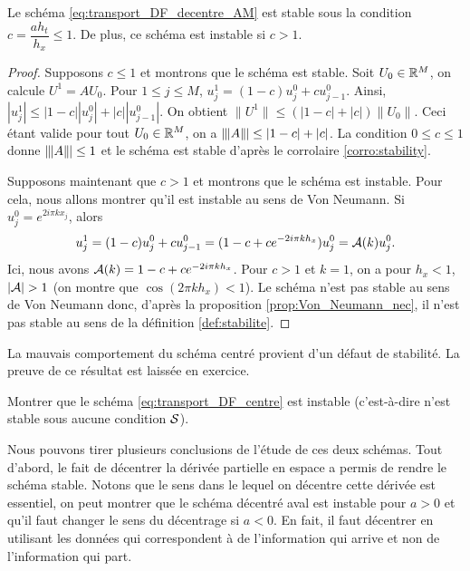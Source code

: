 \documentclass[12pt,a4paper,twoside]{article}
\begin{document}
\begin{proposition}
  \label{prop:stabilite_transport_AM}
  Le sch\'ema \eqref{eq:transport_DF_decentre_AM} est stable
  sous la condition $c = \dfrac{a h_t}{h_x} \leq 1$.
  De plus, ce sch\'ema est instable si $c > 1$.
\end{proposition}
\begin{proof}
  Supposons $c \leq 1$ et montrons que le sch\'ema est stable.
  Soit $U_0 \in \mathbb{R}^M$, on calcule $U^1 = A U_0$.
  Pour $1 \leq j \leq M$, 
  $u_j^1 = (1-c) u_j^0 + c u_{j-1}^0$.
  Ainsi, $|u_j^1| \leq |1-c| | u_j^0 | + | c | | u_{j-1}^0 |$.
  On obtient $\| U^1 \| \leq (|1-c| + |c|) \| U_0 \|$.
  Ceci \'etant valide pour tout $U_0 \in \mathbb{R}^M$, on a $\|\!\;\!| A \|\!\;\!| \leq |1-c| + |c|$.
  La condition $0 \leq c \leq 1$ donne $\|\!\;\!| A \|\!\;\!| \leq 1$ et le sch\'ema est stable 
  d'apr\`es le corrolaire \ref{corro:stability}.

  Supposons maintenant que $c > 1$ et montrons que le sch\'ema est instable.
  Pour cela, nous allons montrer qu'il est instable au sens de Von Neumann.
  Si $u_j^0 = e^{2i\pi k x_j}$, alors
  \[
    u_j^{1} = (1-c) u_j^0 + c u_{j-1}^0 = (1 - c + c e^{-2i\pi k h_x}) u_j^0 
    = \mathcal{A}(k) u_j^0.
  \]
  Ici, nous avons $\mathcal{A}(k) = 1 - c + c e^{-2i\pi k h_x}$.
  Pour $c > 1$ et $k=1$, on a pour $h_x<1$,
  $| \mathcal{A} | > 1$ (on montre que $\cos(2\pi k h_x) < 1$). 
  Le sch\'ema n'est pas stable au sens 
  de Von Neumann donc, d'apr\`es la proposition \ref{prop:Von_Neumann_nec},
  il n'est pas stable au sens de la d\'efinition \ref{def:stabilite}.
\end{proof}

La mauvais comportement du sch\'ema centr\'e provient d'un d\'efaut
de stabilit\'e. La preuve de ce r\'esultat est laiss\'ee en exercice.
\begin{exercise}
  Montrer que le sch\'ema \eqref{eq:transport_DF_centre} est instable
  (c'est-\`a-dire n'est stable sous aucune condition $\mathcal{S}$).
\end{exercise}



Nous pouvons tirer plusieurs conclusions de l'\'etude de ces deux sch\'emas.
Tout d'abord, le fait de d\'ecentrer la d\'eriv\'ee partielle en espace
a permis de rendre le sch\'ema stable.
Notons que le sens dans le lequel on d\'ecentre cette d\'eriv\'ee est essentiel,
on peut montrer que le sch\'ema d\'ecentr\'e aval est instable pour 
$a>0$ et qu'il faut changer le sens du d\'ecentrage si $a<0$.
En fait, il faut d\'ecentrer en utilisant les donn\'ees qui correspondent
\`a de l'information qui arrive et non de l'information qui part.
\end{document}
